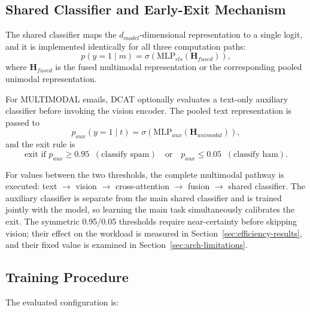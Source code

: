 \documentclass[10pt,twoside]{article}
\begin{document}
\subsection{Shared Classifier and Early-Exit Mechanism}\label{sec:classifier}

The shared classifier maps the $d_{model}$-dimensional representation to a single logit, and it is implemented identically for all three computation paths:
\begin{equation}\label{eq:pmain}
p(y = 1 \mid m) = \sigma\!\left( \text{MLP}_{cls}(\mathbf{H}_{fused}) \right),
\end{equation}
where $\mathbf{H}_{fused}$ is the fused multimodal representation or the corresponding pooled unimodal representation.

For MULTIMODAL emails, DCAT optionally evaluates a text-only auxiliary classifier before invoking the vision encoder. The pooled text representation is passed to
\begin{equation}\label{eq:paux}
p_{aux}(y = 1 \mid t) = \sigma\!\left( \text{MLP}_{aux}(\mathbf{H}_{unimodal}) \right),
\end{equation}
and the exit rule is
\begin{equation}\label{eq:exit}
\text{exit if } p_{aux} \geq 0.95 \;\;(\text{classify spam}) \quad \text{or} \quad p_{aux} \leq 0.05 \;\;(\text{classify ham}).
\end{equation}

For values between the two thresholds, the complete multimodal pathway is executed: text $\rightarrow$ vision $\rightarrow$ cross-attention $\rightarrow$ fusion $\rightarrow$ shared classifier. The auxiliary classifier is separate from the main shared classifier and is trained jointly with the model, so learning the main task simultaneously calibrates the exit. The symmetric 0.95/0.05 thresholds require near-certainty before skipping vision; their effect on the workload is measured in Section~\ref{sec:efficiency-results}, and their fixed value is examined in Section~\ref{sec:arch-limitations}.

\subsection{Training Procedure}\label{sec:training}

The evaluated configuration is:
\end{document}
